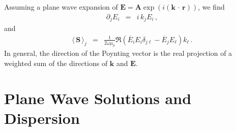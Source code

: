 \documentclass[12pt,a4paper,twoside,openright,BCOR10mm,headsepline,titlepage,abstracton,chapterprefix,final]{scrreprt}
\newcommand\Vector[1]{{\mathbf{#1}}}
\newcommand\vacuum{0}
\newcommand\Location{\Vector{r}}
\newcommand\wavenumber{k}
\newcommand\Wavevector{\Vector{\wavenumber}}
\newcommand{\scpm}[2]{(#1\,\cdot\,#2)}
\newcommand\scalarEfield{E}
\newcommand\Efield{\Vector{\scalarEfield}}
\newcommand\vacuumpermeability{\mu_{\vacuum}}
\newcommand{\timeavg}[1]{{\langle\,#1\,\rangle}}
\begin{document}
Assuming a plane wave expansion of $\Efield = \Vector{A} \exp(i \scpm{\Vector{k}}{\Location})$, we find
\begin{eqnarray}
  \partial_j E_i &=& i\,k_j E_i\,,
\end{eqnarray}
and
\begin{eqnarray}
 \timeavg{\Vector{S}}_j &=&  
    \frac{1}{2 \omega \vacuumpermeability}\Re( 
	\overline{\scalarEfield}_i \scalarEfield_i \delta_{j\ell}  
	- \overline{\scalarEfield}_j \scalarEfield_\ell 
      ) k_\ell\,.\label{eq:poyntingvector}
\end{eqnarray}
In general, the direction of the Poynting vector is the real projection of a weighted sum of the directions of $\Wavevector$ and $\Efield$.


\section{Plane Wave Solutions and Dispersion}
\end{document}

